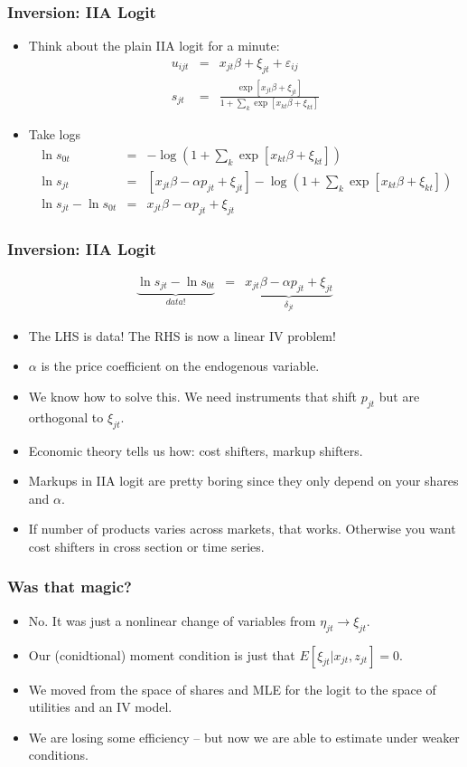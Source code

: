 \begin{frame}
\frametitle{Inversion: IIA Logit}
 \begin{itemize}
\item Think about the plain IIA logit for a minute:
\begin{eqnarray*}
u_{ijt} &=& x_{jt} \beta + \xi_{jt} +  \varepsilon_{ij} \\
s_{jt} &=& \frac{\exp[x_{jt} \beta + \xi_{jt} ]}{1+\sum_k \exp[x_{kt} \beta + \xi_{kt} ]} 
\end{eqnarray*}
\item Take logs
\begin{eqnarray*}
\ln s_{0t} &=& -\log \left(1+\sum_k \exp[x_{kt} \beta + \xi_{kt}] \right) \\
\ln s_{jt} &=& [x_{jt} \beta - \alpha p_{jt} +  \xi_{jt} ] - \log \left(1+\sum_k \exp[x_{kt} \beta + \xi_{kt}] \right)\\
\ln s_{jt}- \ln s_{0t} &=& x_{jt} \beta -\alpha p_{jt} +  \xi_{jt}
\end{eqnarray*}
 \end{itemize}
\end{frame}

\begin{frame}
\frametitle{Inversion: IIA Logit}
\begin{eqnarray*}
\underbrace{\ln s_{jt}- \ln s_{0t}}_{data!}&=& \underbrace{x_{jt} \beta -\alpha p_{jt} +  \xi_{jt}}_{\delta_{jt}}
\end{eqnarray*}
 \begin{itemize}
\item The LHS is data! The RHS is now a linear IV problem!
\item $\alpha$ is the price coefficient on the endogenous variable.
\item We know how to solve this. We need instruments that shift $p_{jt}$ but are orthogonal to $\xi_{jt}$.
\item Economic theory tells us how: cost shifters, markup shifters.
\item Markups in IIA logit are pretty boring since they only depend on your shares and $\alpha$.
\item If number of products varies across markets, that works. Otherwise you want cost shifters in cross section or time series.
 \end{itemize}
\end{frame}


\begin{frame}
\frametitle{Was that magic?}
\begin{itemize}
\item No. It was just a nonlinear change of variables from $\eta_{jt} \rightarrow \xi_{jt}$.
\item Our (conidtional) moment condition is just that $E[\xi_{jt} | x_{jt}, z_{jt}]=0$.
\item We moved from the space of shares and MLE for the logit to the space of utilities and an IV model.
\item We are losing some efficiency -- but now we are able to estimate under weaker conditions.
 \end{itemize}
\end{frame}

